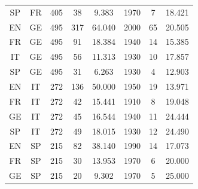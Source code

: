 \documentclass[10pt,letterpaper]{article} %
\begin{document}
\begin{table}
\begin{tabular}{cccccccc}
		SP &       FR &                     405 &                     38 &              9.383 &                    1970 &                             7 &                             18.421 \\
		EN &       GE &                     495 &                    317 &             64.040 &                    2000 &                            65 &                             20.505 \\
		FR &       GE &                     495 &                     91 &             18.384 &                    1940 &                            14 &                             15.385 \\
		IT &       GE &                     495 &                     56 &             11.313 &                    1930 &                            10 &                             17.857 \\
		SP &       GE &                     495 &                     31 &              6.263 &                    1930 &                             4 &                             12.903 \\
		EN &       IT &                     272 &                    136 &             50.000 &                    1950 &                            19 &                             13.971 \\
		FR &       IT &                     272 &                     42 &             15.441 &                    1910 &                             8 &                             19.048 \\
		GE &       IT &                     272 &                     45 &             16.544 &                    1940 &                            11 &                             24.444 \\
		SP &       IT &                     272 &                     49 &             18.015 &                    1930 &                            12 &                             24.490 \\
		EN &       SP &                     215 &                     82 &             38.140 &                    1990 &                            14 &                             17.073 \\
		FR &       SP &                     215 &                     30 &             13.953 &                    1970 &                             6 &                             20.000 \\
		GE &       SP &                     215 &                     20 &              9.302 &                    1970 &                             5 &                             25.000 \\

\end{tabular}
\end{table}
\end{document}
